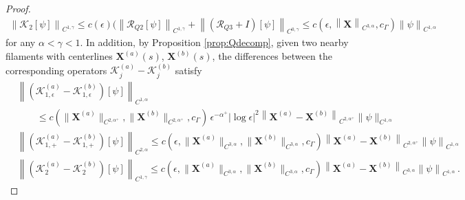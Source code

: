 \documentclass[11pt,reqno]{amsart}
\newcommand{\X}{\bm{X}}
\newcommand{\abs}[1]{\left\lvert #1 \right\rvert}
\newcommand{\norm}[1]{\left\lVert #1 \right\rVert}
\newcommand{\mc}[1]{\mathcal{#1}}
\theoremstyle{definition}
\begin{document}
\begin{proof}
\begin{equation}
\begin{aligned}
  \norm{\mc{K}_2[\psi]}_{C^{1,\gamma}} \le c(\epsilon)\big(\norm{\mc{R}_{Q2}[\psi]}_{C^{1,\gamma}}+\norm{(\mc{R}_{Q3}+I)[\psi]}_{C^{0,\gamma}}
  \le c(\epsilon,\norm{\X}_{C^{3,\alpha}},c_\Gamma)\norm{\psi}_{C^{1,\alpha}}
\end{aligned}
\end{equation}
for any $\alpha<\gamma<1$. In addition, by Proposition \ref{prop:Qdecomp}, given two nearby filaments with centerlines $\X^{(a)}(s)$, $\X^{(b)}(s)$, the differences between the corresponding operators $\mc{K}_j^{(a)}-\mc{K}_j^{(b)}$ satisfy
\begin{equation}
\begin{aligned}
  &\norm{(\mc{K}_{1,\epsilon}^{(a)}- \mc{K}_{1,\epsilon}^{(b)})[\psi]}_{C^{1,\alpha}}\\
  &\qquad \le c(\|\X^{(a)}\|_{C^{2,\alpha^+}},\|\X^{(b)}\|_{C^{2,\alpha^+}},c_\Gamma)\, \epsilon^{-\alpha^+}\abs{\log\epsilon}^2\norm{\X^{(a)}-\X^{(b)}}_{C^{2,\alpha^+}}\|\psi\|_{C^{1,\alpha}}\\
  &\norm{(\mc{K}_{1,+}^{(a)}-\mc{K}_{1,+}^{(b)})[\psi]}_{C^{2,\alpha}} \le c(\epsilon,\|\X^{(a)}\|_{C^{3,\alpha}},\|\X^{(b)}\|_{C^{3,\alpha}},c_\Gamma)\norm{\X^{(a)}-\X^{(b)}}_{C^{2,\alpha^+}}\norm{\psi}_{C^{1,\alpha}}\\
  &\norm{(\mc{K}_2^{(a)}-\mc{K}_2^{(b)})[\psi]}_{C^{1,\gamma}} \le c(\epsilon,\|\X^{(a)}\|_{C^{3,\alpha}},\|\X^{(b)}\|_{C^{3,\alpha}},c_\Gamma)\norm{\X^{(a)}-\X^{(b)}}_{C^{3,\alpha}}\norm{\psi}_{C^{1,\alpha}}\,.
\end{aligned}
\end{equation} 



\end{proof}
\end{document}
